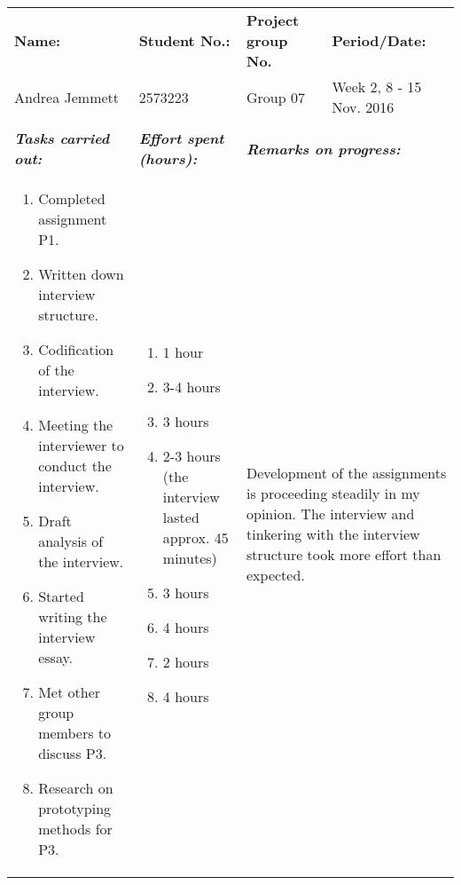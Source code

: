 \documentclass[a4paper]{article}
\begin{document}
\begin{center}
  \bgroup
  \def\arraystretch{1.5}
  \begin{tabular}{ | p{6cm} | p{6cm} | p{6cm} | p{6cm} | }
    \hline
    \textbf{Name:} &
    \textbf{Student No.:} &
    \textbf{Project group No.} &
    \textbf{Period/Date:} \\
    Andrea Jemmett &
    2573223 &
    Group 07 &
    Week 2, 8 - 15 Nov. 2016 \\
    \hline
    \rowcolor{yellow!25}\multicolumn{4}{|p{24cm}|}{\textbf{Past week:}} \\
    \hline
    \textbf{\textit{Tasks carried out:}} &
    \textbf{\textit{Effort spent (hours):}} &
    \multicolumn{2}{|l|}{\textbf{\textit{Remarks on progress:}}} \\
    \begin{enumerate}
      \vspace{-6mm}
      \item Completed assignment P1.
      \item Written down interview structure.
      \item Codification of the interview.
      \item Meeting the interviewer to conduct the interview.
      \item Draft analysis of the interview.
      \item Started writing the interview essay.
      \item Met other group members to discuss P3.
      \item Research on prototyping methods for P3.
    \end{enumerate} &
    \begin{enumerate}
      \vspace{-6mm}
      \item 1 hour
      \item 3-4 hours
      \item 3 hours
      \item 2-3 hours (the interview lasted approx. 45 minutes)
      \item 3 hours
      \item 4 hours
      \item 2 hours
      \item 4 hours
    \end{enumerate} &
    \multicolumn{2}{|p{12cm}|}{Development of the assignments is proceeding
    steadily in my opinion. The interview and tinkering with the interview
    structure took more effort than expected.} \\

\end{tabular}
\end{center}
\end{document}
